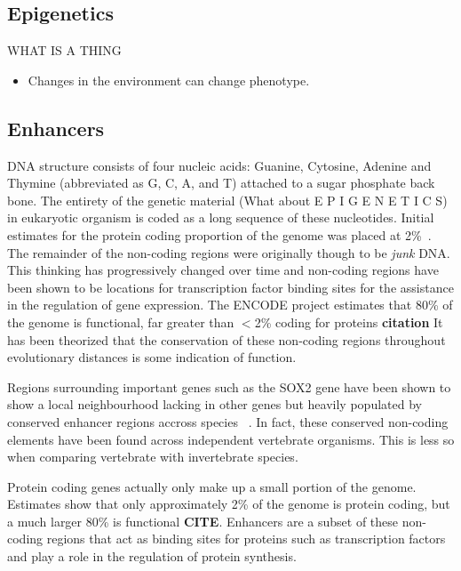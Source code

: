 \subsection{Epigenetics}
    WHAT IS A THING
        \begin{itemize}
            \item Changes in the environment can change phenotype. 
        \end{itemize}
\subsection{Enhancers}
	DNA structure consists of four nucleic acids: Guanine, Cytosine, Adenine and Thymine (abbreviated as G, C, A,  and T) attached to a sugar phosphate back bone.
	The {\color{red}entirety of the genetic material (What about E P I G E N E T I C S)} in eukaryotic organism is coded as a long sequence of these nucleotides. Initial estimates for the protein coding proportion of the genome was placed at  2\%~\cite{international2001initial}. 
	The remainder of the non-coding regions were originally though to be \emph{junk} DNA. This thinking has progressively changed over time and non-coding regions have been shown to be locations for transcription factor binding sites for the assistance in the regulation of gene expression. {\color{red} The ENCODE project estimates that 80\% of the genome is functional, far greater than $<$2\% coding for proteins \textbf{citation}}
	It has been theorized that the conservation of these non-coding regions throughout evolutionary distances is some indication of function.
	
	Regions surrounding important genes such as the SOX2 gene have been shown to show a local neighbourhood lacking in other genes but heavily populated by conserved enhancer regions accross species {~\cite{uchikawa2003functional}}. In fact, these conserved non-coding elements have been found across independent vertebrate organisms. This is less so when comparing vertebrate with invertebrate species. 
	
	
	Protein coding genes actually only make up a small portion of the genome. Estimates show that only approximately 2\% of the genome is protein coding, but a much larger 80\% is functional \textbf{CITE}. Enhancers are a subset of these non-coding regions that act as binding sites for proteins such as transcription factors and play a role in the regulation of protein synthesis.
	
